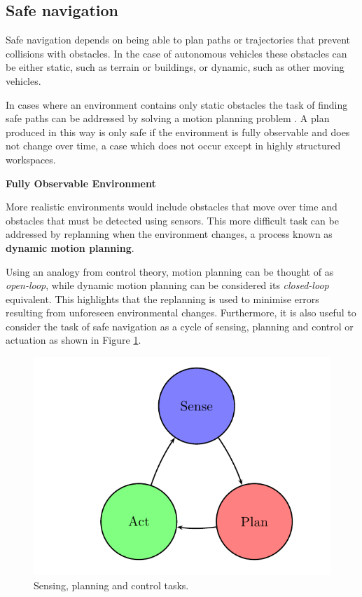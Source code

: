 \subsection{Safe navigation}
Safe navigation depends on being able to plan paths or trajectories that prevent collisions with
obstacles. In the case of autonomous vehicles these obstacles can be either static, such as
terrain or buildings, or dynamic, such as other moving vehicles.

In cases where an environment contains only static obstacles the task of finding safe paths
can be addressed by solving a motion planning problem \cite{LaValle2006}. A plan produced in this way
is only safe if the environment is fully observable and does not change over time, a case which
does not occur except in highly structured workspaces.

\begin{framed}
\theoremstyle{remark}
\begin{remark}{\textbf{Fully Observable Environment}}
 
\end{remark}
\end{framed}

More realistic environments would include obstacles that move over time and obstacles
that must be detected using sensors. This more difficult task can be addressed by replanning
when the environment changes, a process known as \textbf{dynamic motion planning}.


Using an analogy from control theory, motion planning can be thought of as {\em open-loop},
while dynamic motion planning can be considered its {\em closed-loop} equivalent. This highlights that 
the replanning is used to minimise errors resulting from unforeseen environmental changes. 
Furthermore, it is also useful to consider the task of safe navigation as a cycle of sensing, planning
and control or actuation as shown in Figure \ref{sense_plan_control_tasks_cycle}.

\begin{figure}[!htb]
\begin{center}
\includegraphics[scale=0.280]{img/motion_planning/sense_plan_control_tasks_cycle.jpeg}
\end{center}
\caption{ Sensing, planning and control tasks.}
\label{sense_plan_control_tasks_cycle}
\end{figure}

